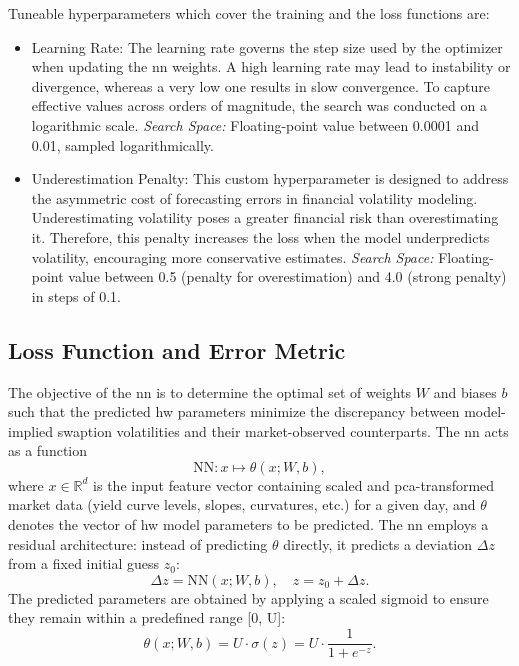 Tuneable hyperparameters which cover the training and the loss functions are:
\begin{itemize}
	\item Learning Rate: The learning rate governs the step size used by the optimizer when updating the \ac{nn} weights. A high learning rate may lead to instability or divergence, whereas a very low one results in slow convergence. To capture effective values across orders of magnitude, the search was conducted on a logarithmic scale. \newline
	      \textit{Search Space:} Floating-point value between 0.0001 and 0.01, sampled logarithmically.

	\item Underestimation Penalty: This custom hyperparameter is designed to address the asymmetric cost of forecasting errors in financial volatility modeling. Underestimating volatility poses a greater financial risk than overestimating it. Therefore, this penalty increases the loss when the model underpredicts volatility, encouraging more conservative estimates. \newline
	      \textit{Search Space:} Floating-point value between 0.5 (penalty for overestimation) and 4.0 (strong penalty) in steps of 0.1.
\end{itemize}

\subsection{Loss Function and Error Metric}
\label{subsec:loss_function_and_error_metric}
The objective of the \ac{nn} is to determine the optimal set of weights $W$ and biases $b$ such that the predicted \ac{hw} parameters minimize the discrepancy between model-implied swaption volatilities and their market-observed counterparts. The \ac{nn} acts as a function
\begin{equation}
	\text{NN} : x \mapsto \theta(x; W, b),
\end{equation}
where $x \in \mathbb{R}^d$ is the input feature vector containing scaled and \ac{pca}-transformed market data (yield curve levels, slopes, curvatures, etc.) for a given day, and $\theta$ denotes the vector of \ac{hw} model parameters to be predicted. The \ac{nn} employs a residual architecture: instead of predicting $\theta$ directly, it predicts a deviation $\Delta z$ from a fixed initial guess $z_0$:
\begin{equation}
	\Delta z = \text{NN}(x; W, b), \quad
	z = z_0 + \Delta z.
\end{equation}
The predicted parameters are obtained by applying a scaled sigmoid to ensure they remain within a predefined range [0, U]:
\begin{equation}
	\theta(x; W, b) = U \cdot \sigma(z) = U \cdot \frac{1}{1 + e^{-z}}.
\end{equation}

